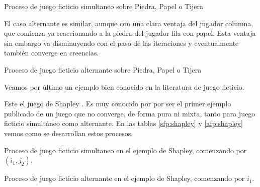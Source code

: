 \begin{table} %
    \centering
    
    \caption{Proceso de juego ficticio simultaneo sobre Piedra, Papel o Tijera}
    \label{sfp:piedra:papel:tijera}
\end{table}

El caso alternante es similar, aunque con una clara ventaja del jugador columna, que comienza ya reaccionando a la piedra del jugador fila con papel. Esta ventaja sin embargo va disminuyendo con el paso de las iteraciones y eventualmente también converge en creencias.


\begin{table} %
    \centering
    
    \caption{Proceso de juego ficticio alternante sobre Piedra, Papel o Tijera}
    \label{afp:piedra:papel:tijera}
\end{table}

Veamos por último un ejemplo bien conocido en la literatura de juego ficticio.



Este el juego de Shapley \cite{shapley:3x3}. Es muy conocido por por ser el primer ejemplo publicado de un juego que no converge, de forma pura ni mixta, tanto para juego ficticio simultáneo como alternante. En las tablas \ref{sfp:shapley} y \ref{afp:shapley} vemos como se desarrollan estos procesos.


\begin{table} %
    \centering
    
    \caption{Proceso de juego ficticio simultaneo en el ejemplo de Shapley, comenzando por $(i_1, j_2)$.}
    \label{sfp:shapley}
\end{table}
\begin{table} %
    \centering
    
    \caption{Proceso de juego ficticio alternante en el ejemplo de Shapley, comenzando por $i_1$.}
    \label{afp:shapley}
\end{table}


